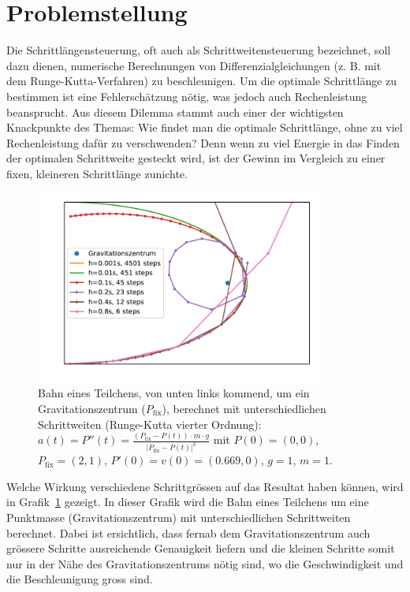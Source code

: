 %
%
%
\section{Problemstellung
\label{steps:section:problemstellung}}
Die Schrittlängensteuerung, oft auch als Schrittweitensteuerung bezeichnet,
soll dazu dienen, numerische Berechnungen von Differenzialgleichungen (z. B. mit dem Runge-Kutta-Verfahren) zu beschleunigen.
Um die optimale Schrittlänge zu bestimmen ist eine Fehlerschätzung nötig,
was jedoch auch Rechenleistung beansprucht.
%
Aus diesem Dilemma stammt auch einer der wichtigsten Knackpunkte des Themas:
Wie findet man die optimale Schrittlänge, ohne zu viel Rechenleistung dafür zu verschwenden?
Denn wenn zu viel Energie in das Finden der optimalen Schrittweite gesteckt wird,
ist der Gewinn im Vergleich zu einer fixen, kleineren Schrittlänge zunichte.

\begin{figure}
\centering
\includegraphics[width=0.85\textwidth]{papers/steps/img/gravity_different_fixed_stepsize.pdf}
\caption{Bahn eines Teilchens, von unten links kommend,
um ein Gravitationszentrum ($P_\text{fix}$), berechnet mit unterschiedlichen Schrittweiten (Runge-Kutta vierter Ordnung):
$a(t)=P''(t)=\frac{(P_\text{fix}-P(t))\cdot m\cdot g}{|P_\text{fix}-P(t)|^{3}}$
mit $P(0)=(0, 0)$, $P_\text{fix}=(2, 1)$, $P'(0)=v(0)=(0.669, 0)$, $g=1$, $m=1$.
\label{buch:steps:fixed_comparison}}
\end{figure}

Welche Wirkung verschiedene Schrittgrössen
auf das Resultat haben können, wird in Grafik~\ref{buch:steps:fixed_comparison} gezeigt.
In dieser Grafik wird die Bahn eines Teilchens um eine Punktmasse (Gravitationszentrum)
%
%
mit unterschiedlichen Schrittweiten berechnet.
Dabei ist ersichtlich, dass fernab dem Gravitationszentrum auch grössere Schritte
ausreichende Genauigkeit liefern und die kleinen Schritte somit nur in der Nähe des Gravitationszentrums
nötig sind, wo die Geschwindigkeit und die Beschleunigung gross sind.
%
%




